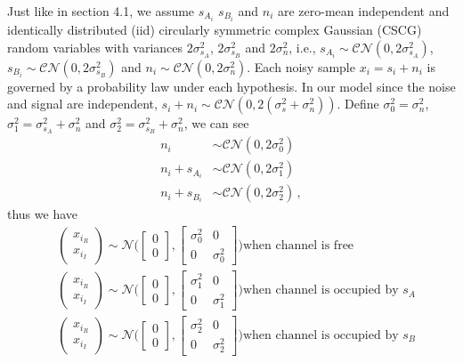Just like in section 4.1, 
we assume  $s_{A_i}$ $s_{B_i}$ and $n_i$ are zero-mean independent and identically distributed (iid) circularly symmetric complex Gaussian (CSCG) random variables with variances $2\sigma_{s_A}^2$, $2\sigma_{s_B}^2$ and $2\sigma_{n}^2$, i.e., $s_{A_i} \sim \mathcal{CN}(0, 2\sigma_{s_A}^2)$, $s_{B_i} \sim \mathcal{CN}(0, 2\sigma_{s_B}^2)$ and $n_i \sim \mathcal{CN}(0, 2\sigma_{n}^2)$.
Each noisy sample $x_i = s_i + n_i$ is governed by a probability law under each hypothesis. In our model
since the noise and signal are independent, $s_i+ n_i \sim \mathcal{CN}(0, 2(\sigma_{s}^2 + \sigma_n^2))$.  Define $\sigma_0^2 = \sigma_n^2$, $\sigma_1^2 = \sigma_{s_A}^2 + \sigma_n^2$ and $\sigma_2^2 = \sigma_{s_B}^2 + \sigma_n^2$, we can see
\begin{equation}
  \label{1129a1}
  \begin{split}
  n_i &\sim \mathcal{CN}(0, 2\sigma_0^2)\\
  n_i + s_{A_i} &\sim \mathcal{CN}(0, 2\sigma_1^2)\\
   n_i + s_{B_i}&\sim \mathcal{CN}(0, 2\sigma_2^2) \,,
  \end{split}
\end{equation}
thus we have 
\begin{equation}
   \begin{split}
     &\begin{pmatrix} x_{i_R} \\ x_{i_I} \end{pmatrix} \sim \mathcal{N}\Big( \begin{bmatrix} 0 \\ 0 \end{bmatrix}, \begin{bmatrix} \sigma_0^2 & 0\\ 0 & \sigma_0^2 \end{bmatrix} \Big) \text{when channel is free}\\
     &\begin{pmatrix} x_{i_R} \\ x_{i_I} \end{pmatrix} \sim \mathcal{N}\Big( \begin{bmatrix} 0 \\ 0 \end{bmatrix}, \begin{bmatrix} \sigma_1^2 & 0\\ 0 & \sigma_1^2 \end{bmatrix} \Big) \text{when channel is occupied by $s_A$}\\
     &\begin{pmatrix} x_{i_R} \\ x_{i_I} \end{pmatrix} \sim \mathcal{N}\Big( \begin{bmatrix} 0 \\ 0 \end{bmatrix}, \begin{bmatrix} \sigma_2^2 & 0\\ 0 & \sigma_2^2 \end{bmatrix} \Big) \text{when channel is occupied by $s_B$}
\end{split}
  \label{equ:xdistribution2}
\end{equation}
